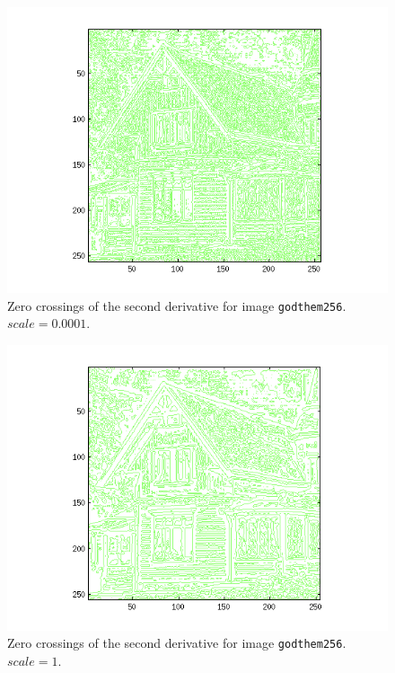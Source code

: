 
\begin{figure}[H]
	\centering
	\includegraphics[scale=0.8]{./images/Q4/vv/0.0001.png}
	\caption{Zero crossings of the second derivative for image \texttt{godthem256}. $scale = 0.0001$.}
	\label{fig:Q4_vv_0.0001}
\end{figure}

\begin{figure}[H]
	\centering
	\includegraphics[scale=0.8]{./images/Q4/vv/1.png}
	\caption{Zero crossings of the second derivative for image \texttt{godthem256}. $scale = 1$.}
	\label{fig:Q4_vv_1}
\end{figure}

